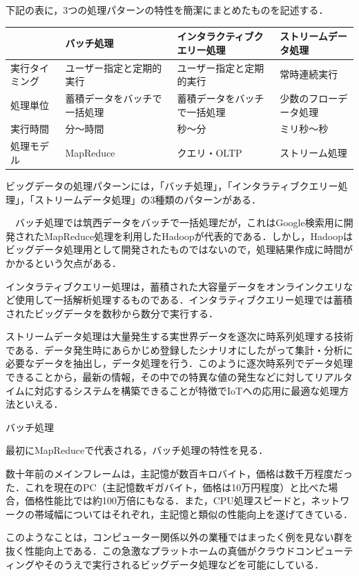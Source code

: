 下記の表に，3つの処理パターンの特性を簡潔にまとめたものを記述する．

\begin{table}[H]
  \begin{tabular}{|l|l|l|l|} \hline
                     & バッチ処理 & インタラクティブクエリー処理 & ストリームデータ処理 \\ \hline
    実行タイミング & ユーザー指定と定期的実行 & ユーザー指定と定期的実行 & 常時連続実行 \\ \hline
    処理単位 & 蓄積データをバッチで一括処理 & 蓄積データをバッチで一括処理 & 少数のフローデータ処理 \\ \hline
    実行時間 & 分～時間 & 秒～分 & ミリ秒～秒 \\ \hline
    処理モデル & MapReduce & クエリ・OLTP & ストリーム処理 \\ \hline
  \end{tabular}
\end{table}


ビッグデータの処理パターンには，「バッチ処理」，「インタラティブクエリー処理」，「ストリームデータ処理」の3種類のパターンがある．

　バッチ処理では筑西データをバッチで一括処理だが，これはGoogle検索用に開発されたMapReduce処理を利用したHadoopが代表的である．しかし，Hadoopはビッグデータ処理用として開発されたものではないので，処理結果作成に時間がかかるという欠点がある．

インタラティブクエリー処理は，蓄積された大容量データをオンラインクエリなど使用して一括解析処理するものである．インタラティブクエリー処理では蓄積されたビッグデータを数秒から数分で実行する．

ストリームデータ処理は大量発生する実世界データを逐次に時系列処理する技術である．データ発生時にあらかじめ登録したシナリオにしたがって集計・分析に必要なデータを抽出し，データ処理を行う．このように逐次時系列でデータ処理できることから，最新の情報，その中での特異な値の発生などに対してリアルタイムに対応するシステムを構築できることが特徴でIoTへの応用に最適な処理方法といえる．


バッチ処理

最初にMapReduceで代表される，バッチ処理の特性を見る．

数十年前のメインフレームは，主記憶が数百キロバイト，価格は数千万程度だった．これを現在のPC（主記憶数ギガバイト，価格は10万円程度）と比べた場合，価格性能比では約100万倍にもなる．また，CPU処理スピードと，ネットワークの帯域幅についてはそれぞれ，主記憶と類似の性能向上を遂げてきている．

このようなことは，コンピューター関係以外の業種ではまったく例を見ない群を抜く性能向上である．この急激なプラットホームの真価がクラウドコンピューティングやそのうえで実行されるビッグデータ処理などを可能にしている．

